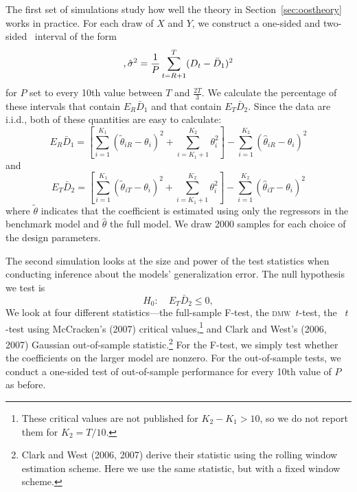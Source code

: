 \documentclass[11pt]{article}
\newcommand{\dmw}{\textsc{dmw}}
\begin{document}
The first set of simulations study how well the theory in
Section~\ref{sec:oostheory} works in practice.  For each draw of $X$
and $Y$, we construct a one-sided and two-sided \oos\ interval of the
form
\begin{equation*}
  [ \bar D_1 - 1.28 \hat{\sigma}, \infty) \quad\text{and}\quad
  [ \bar D_1 - 1.64 \hat{\sigma}, \bar D_1 + 1.64\ \hat{\sigma}], \\
  \hat\sigma^2 = \frac1P \sum_{t=R+1}^T (D_t - \bar D_{1})^{2}
\end{equation*}
for $P$ set to every 10th value between $T$ and $\frac{2T}{3}$.  We
calculate the percentage of these intervals that contain $E_R \bar
D_1$ and that contain $E_T \bar D_2$.  Since the data are i.i.d.,
both of these quantities are easy to calculate:
\begin{equation*}
  E_R \bar D_1 = [\sum_{i=1}^{K_1} (\tilde{\theta}_{iR} - \theta_i)^2 +
  \sum_{i=K_1+1}^{K_2}\theta_i^2] - \sum_{i=1}^{K_2} (\hat{\theta}_{iR} -
  \theta_i)^2
\end{equation*}
and
\begin{equation*}
  E_T \bar D_2 = [\sum_{i=1}^{K_1} (\tilde{\theta}_{iT} - \theta_i)^2 +
  \sum_{i=K_1+1}^{K_2}\theta_i^2] - \sum_{i=1}^{K_2} (\hat{\theta}_{iT} -
  \theta_i)^2
\end{equation*}
where $\tilde{\theta}$ indicates that the coefficient is estimated
using only the regressors in the benchmark model and $\hat{\theta}$
the full model.  We draw 2000 samples for each choice of the design
parameters.

The second simulation looks at the size and power of the test
statistics when conducting inference about the models' generalization
error.  The null hypothesis we test is 
\begin{equation}\label{eq:9}
  H_0:\quad E_T \bar D_2 \leq 0,
\end{equation}
We look at four different statistics---the full-sample F-test, the
\dmw\ $t$-test, the
\oos\ $t$-test using McCracken's (2007)
critical values,\footnote{These critical values are not published for
  $K_2-K_1>10$, so we do not report them for $K_2 = T/10$.}
and Clark and West's (2006, 2007) Gaussian out-of-sample
statistic.\footnote{Clark and West (2006, 2007) derive their statistic
using the rolling window estimation scheme.  Here we use the same
statistic, but with a fixed window scheme.}
For the F-test, we simply test whether the coefficients on the larger
model are nonzero.  For the out-of-sample tests, we conduct a
one-sided test of out-of-sample performance for every 10th value of
$P$ as before.
\end{document}

